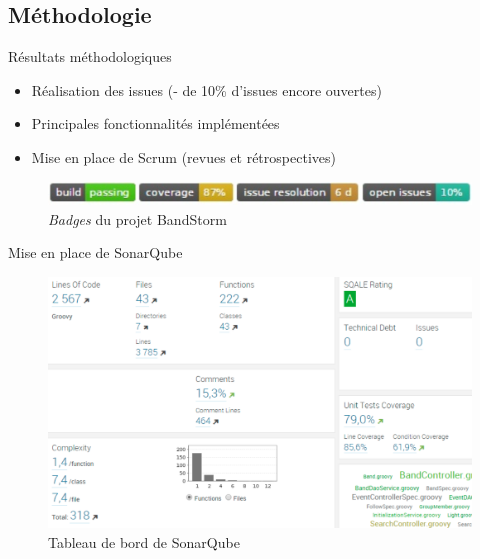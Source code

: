
\subsection{Méthodologie}
\DylanSpeak
\begin{frame}{Résultats méthodologiques}
	\begin{itemize}
	\item Réalisation des issues \scriptsize{(- de 10\% d’issues encore ouvertes)}
	\normalsize
	\item Principales fonctionnalités implémentées
	\item Mise en place de Scrum \scriptsize{(revues et rétrospectives)}
	\end{itemize}
	\begin{figure}[H]
		\centering
		\includegraphics[width=0.8\linewidth]{"images/Results/methodo/badges"}
		\caption{\textit{Badges} du projet BandStorm}
		\label{fig:badges}
	\end{figure}\end{frame}
\SteveSpeak
\begin{frame}{Mise en place de SonarQube}
\begin{figure}
	\centering
	\includegraphics[width=0.95\linewidth]{"images/Results/methodo/sonar"}
	\caption{Tableau de bord de SonarQube}
	\label{fig:sonar}
\end{figure}
	
\end{frame}

